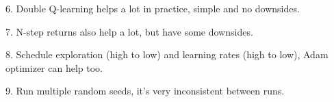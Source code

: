 \documentclass{article}
\begin{document}
6. Double Q-learning helps a lot in practice, simple and no downsides.

7. N-step returns also help a lot, but have some downsides.

8. Schedule exploration (high to low) and learning rates (high to low),  Adam optimizer can help too.

9. Run multiple random seeds, it’s very inconsistent between runs.



























\small


\end{document}
